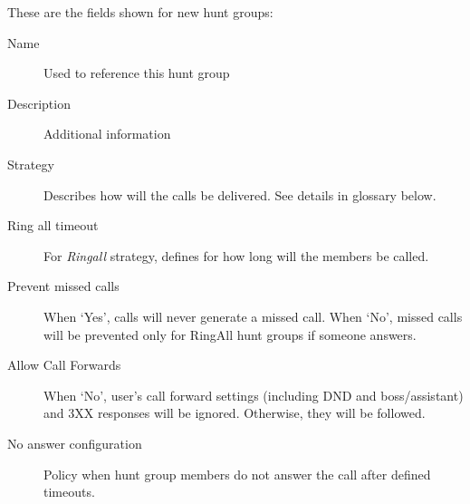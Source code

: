 \documentclass[letterpaper,10pt,spanish]{sphinxmanual}
\begin{document}
These are the fields shown for new hunt groups:
\begin{description}
\item[{Name}] \leavevmode{}\label{administration_portal/client/vpbx/routing_endpoints/hunt_groups:term-name}
Used to reference this hunt group

\item[{Description}] \leavevmode{}\label{administration_portal/client/vpbx/routing_endpoints/hunt_groups:term-description}
Additional information

\item[{Strategy}] \leavevmode{}\label{administration_portal/client/vpbx/routing_endpoints/hunt_groups:term-strategy}
Describes how will the calls be delivered. See details in glossary below.

\item[{Ring all timeout}] \leavevmode{}\label{administration_portal/client/vpbx/routing_endpoints/hunt_groups:term-ring-all-timeout}
For \emph{Ringall} strategy, defines for how long will the members be called.

\item[{Prevent missed calls}] \leavevmode{}\label{administration_portal/client/vpbx/routing_endpoints/hunt_groups:term-prevent-missed-calls}
When `Yes', calls will never generate a missed call. When `No', missed calls will be prevented only for RingAll
hunt groups if someone answers.

\item[{Allow Call Forwards}] \leavevmode{}\label{administration_portal/client/vpbx/routing_endpoints/hunt_groups:term-allow-call-forwards}
When `No', user's call forward settings (including DND and boss/assistant) and 3XX responses will be ignored. Otherwise, they will be followed.

\item[{No answer configuration}] \leavevmode{}\label{administration_portal/client/vpbx/routing_endpoints/hunt_groups:term-no-answer-configuration}
Policy when hunt group members do not answer the call after defined timeouts.

\end{description}
\end{document}
